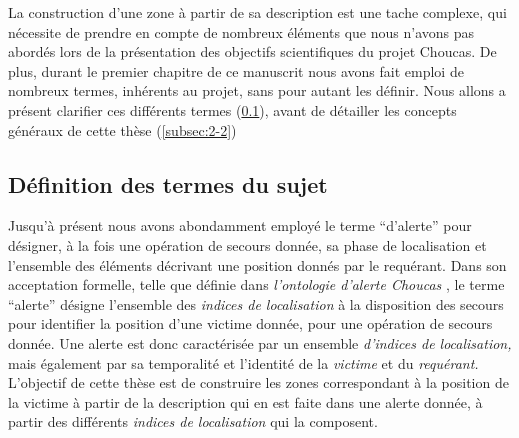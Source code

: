 La construction d'une zone à partir de sa description est une tache
complexe, qui nécessite de prendre en compte de nombreux éléments que
nous n'avons pas abordés lors de la présentation des objectifs
scientifiques du projet Choucas. De plus, durant le premier chapitre
de ce manuscrit nous avons fait emploi de nombreux termes, inhérents
au projet, sans pour autant les définir. Nous allons a présent
clarifier ces différents termes (\ref{subsec:2-1}), avant de détailler
les concepts généraux de cette thèse (\ref{subsec:2-2})

\subsection{Définition des termes du sujet}
\label{subsec:2-1}

Jusqu'à présent nous avons abondamment employé le terme
\enquote{d'alerte} pour désigner, à la fois une opération de secours
donnée, sa phase de localisation et l'ensemble des éléments décrivant
une position donnés par le requérant. Dans son acceptation formelle,
\ie telle que définie dans \emph{l’ontologie d'alerte Choucas}
\autocite[\ac{oac},][]{Viry2019}, le terme \enquote{alerte} désigne
l'ensemble des \emph{indices de localisation} à la disposition des
secours pour identifier la position d'une victime donnée, pour une
opération de secours donnée. Une alerte est donc caractérisée par un
ensemble \emph{d'indices de localisation,} mais également par sa
temporalité et l'identité de la \emph{victime} et du \emph{requérant.}
L'objectif de cette thèse est de construire les zones correspondant à
la position de la victime à partir de la description qui en est faite
dans une alerte donnée, \ie à partir des différents \emph{indices de
  localisation} qui la composent.

